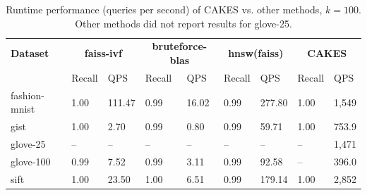 \begin{table}[!t]
    \caption{Runtime performance (queries per second) of CAKES vs. other methods, $k=100$. Other methods did not report results for glove-25.}
    \label{table:results:ann-100}
    \vskip 0.15in
    \begin{center}
    \begin{small}
    \begin{sc}
    \begin{tabular}{|l|p{1cm}|p{1cm}|p{1cm}|p{1cm}|p{1cm}|p{1cm}|p{1cm}|p{1cm}|}
    \textbf{Dataset}  & \multicolumn{2}{|c|}{\textbf{faiss-ivf}} & \multicolumn{2}{|c|}{\textbf{bruteforce-blas}} & \multicolumn{2}{|c|}{\textbf{hnsw(faiss)}} & \multicolumn{2}{|c|}{\textbf{CAKES}} \\
    &                    Recall & QPS                           & Recall & QPS                           & Recall & QPS                                           & Recall & QPS \\
    \hline
    fashion-mnist         & 1.00 & 111.47                           & 0.99 & 16.02                                  & 0.99 & 277.80                                                    & 1.00 & 1,549 \\ 
    \hline
    gist                   & 1.00 & 2.70                           & 0.99 & 0.80                                 & 0.99 & 59.71                                                    & 1.00 & 753.9 \\
    \hline
    glove-25              & -- & --                                & -- & --                                & -- & --                                                    & -- & 1,471 \\
    \hline
    glove-100             & 0.99 &  7.52                          & 0.99 & 3.11                                  & 0.99 & 92.58                                                    & -- & 396.0 \\
    \hline
    sift                  & 1.00 &  23.50                          & 1.00 & 6.51                                  & 0.99 & 179.14                                                    & 1.00 & 2,852 \\                                                 
    \hline
    \end{tabular}
    \end{sc}
    \end{small}
    \end{center}
    \vskip -0.1in
    \end{table}


